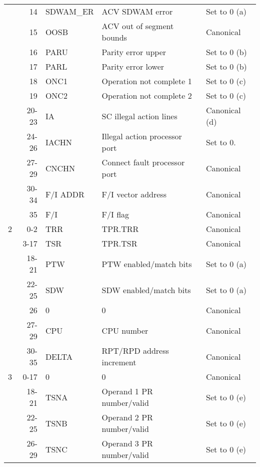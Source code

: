 \documentclass[notitlepage]{report}
\begin{document}
\begin{tabular}{lrlll}
     & 14    & SDWAM\_ER & ACV SDWAM error                     & Set to 0 (a) \\
     & 15    & OOSB      & ACV out of segment bounds           & Canonical \\
     & 16    & PARU      & Parity error upper                  & Set to 0 (b) \\
     & 17    & PARL      & Parity error lower                  & Set to 0 (b) \\
     & 18    & ONC1      & Operation not complete 1            & Set to 0 (c) \\
     & 19    & ONC2      & Operation not complete 2            & Set to 0 (c) \\
     & 20-23 & IA        & SC illegal action lines             & Canonical (d) \\
     & 24-26 & IACHN     & Illegal action processor port       & Set to 0. \\
     & 27-29 & CNCHN     & Connect fault processor port        & Canonical \\
     & 30-34 & F/I ADDR  & F/I vector address                  & Canonical \\
     & 35    & F/I       & F/I flag                            & Canonical \\
2    & 0-2   & TRR       & TPR.TRR                             & Canonical \\
     & 3-17  & TSR       & TPR.TSR                             & Canonical \\
     & 18-21 & PTW       & PTW enabled/match bits              & Set to 0 (a) \\
     & 22-25 & SDW       & SDW enabled/match bits              & Set to 0 (a) \\
     & 26    & 0         & 0                                   & Canonical \\
     & 27-29 & CPU       & CPU number                          & Canonical \\
     & 30-35 & DELTA     & RPT/RPD address increment           & Canonical \\
3    & 0-17  & 0         & 0                                   & Canonical \\
     & 18-21 & TSNA      & Operand 1 PR number/valid           & Set to 0 (e) \\
     & 22-25 & TSNB      & Operand 2 PR number/valid           & Set to 0 (e) \\
     & 26-29 & TSNC      & Operand 3 PR number/valid           & Set to 0 (e) \\

\end{tabular}
\end{document}
